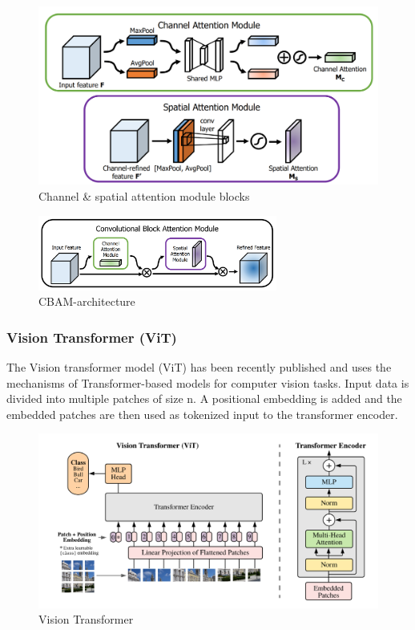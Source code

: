 \begin{figure}[H]
    \centering
    \includegraphics[width=\textwidth]{Figures/cbam_modules.png}
    \caption{Channel \& spatial attention module blocks \cite{woo_cbam_2018}}
    \label{fig:cbam_modules}
\end{figure}

\begin{figure}[H]
    \centering
    \includegraphics[width=0.7\textwidth]{Figures/cbam_modul.png}
    \caption{CBAM-architecture \cite{woo_cbam_2018}}
    \label{fig:cbam}
\end{figure}


\subsubsection{Vision Transformer (ViT)}
The Vision transformer model (ViT) has been recently published \cite{dosovitskiy_image_2021} and uses the mechanisms of Transformer-based models for computer vision tasks. Input data is divided into multiple patches of size n. A positional embedding is added and the embedded patches are then used as tokenized input to the transformer encoder. 
\begin{figure}
    \centering
    \includegraphics[width=\textwidth]{Figures/ViT.png}
    \caption{Vision Transformer \cite{dosovitskiy_image_2021}}
    \label{fig:vit_model}
\end{figure}
